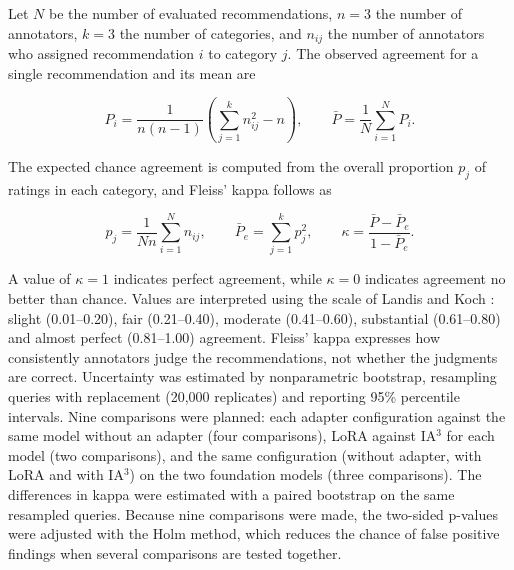 \documentclass[journal,article,submit,pdftex,moreauthors]{Definitions/mdpi}
\begin{document}
Let $N$ be the number of evaluated recommendations, $n=3$ the number of annotators, $k=3$ the number of categories, and $n_{ij}$ the number of annotators who assigned recommendation $i$ to category $j$. The observed agreement for a single recommendation and its mean are

\begin{equation}
P_i = \frac{1}{n(n-1)}\left(\sum_{j=1}^{k} n_{ij}^{2} - n\right), \qquad \bar{P} = \frac{1}{N}\sum_{i=1}^{N} P_i .
\end{equation}

The expected chance agreement is computed from the overall proportion $p_j$ of ratings in each category, and Fleiss' kappa follows as

\begin{equation}
p_j = \frac{1}{Nn}\sum_{i=1}^{N} n_{ij}, \qquad \bar{P}_e = \sum_{j=1}^{k} p_j^{2}, \qquad \kappa = \frac{\bar{P} - \bar{P}_e}{1 - \bar{P}_e}.
\end{equation}

A value of $\kappa = 1$ indicates perfect agreement, while $\kappa = 0$ indicates agreement no better than chance. Values are interpreted using the scale of Landis and Koch \citep{landis1977measurement}: slight (0.01--0.20), fair (0.21--0.40), moderate (0.41--0.60), substantial (0.61--0.80) and almost perfect (0.81--1.00) agreement. Fleiss' kappa expresses how consistently annotators judge the recommendations, not whether the judgments are correct. Uncertainty was estimated by nonparametric bootstrap, resampling queries with replacement (20,000 replicates) and reporting 95\% percentile intervals. Nine comparisons were planned: each adapter configuration against the same model without an adapter (four comparisons), LoRA against IA$^3$ for each model (two comparisons), and the same configuration (without adapter, with LoRA and with IA$^3$) on the two foundation models (three comparisons). The differences in kappa were estimated with a paired bootstrap on the same resampled queries. Because nine comparisons were made, the two-sided p-values were adjusted with the Holm method, which reduces the chance of false positive findings when several comparisons are tested together.
\end{document}
